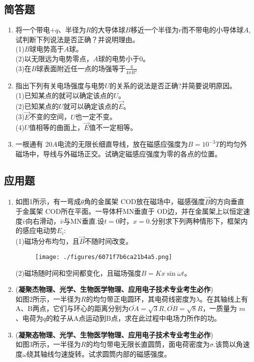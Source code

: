 \subsection{简答题}
\begin{enumerate}
\item 将一个带电$+q$、半径为$R$的大导体球$B$移近一个半径为$r$而不带电的小导体球$A$,试判断下列说法是否正确？并说明理由。\\
(1)$B$球电势高于$A$球。\\
(2)以无限远为电势零点，$A$球的电势小于0。\\
(3)在$B$球表面附近任一点的场强等于$\displaystyle \frac{q}{4\pi R^2}$
\item 指出下列有关电场强度与电势$U$的关系的说法是否正确?并简要说明原因。\\
(1)已知某点的就可以确定该点的$U$。\\
(2)已知某点的$U$就可以确定该点的$\vec E$。\\
(3)$\vec E$不变的空间，$U$也一定不变。\\
(4)$U$值相等的曲面上，$\vec E$值不一定相等。
\item 一根通有 $20A $电流的无限长细直导线，放在磁感应强度为$B=10^{-3}T$的均匀外磁场中，导线与外磁场正交。试确定磁感应强度为零的各点的位置。
\end{enumerate}
\subsection{应用题}
\begin{enumerate}
\item 如图1所示，有一弯成$\theta$角的金属架 COD放在磁场中，磁感强度$\vec B$的方向垂直于金属架 COD所在平面。一导体杆MN垂直于 OD边，并在金属架上以恒定速度$\bar v$向右滑动，$\bar v$与MN垂直.设$t=0$时，$x=0$.分别求下列两种情形下，框架内的感应电动势$E_i$:\\
(1)磁场分布均匀，且$\vec B$不随时间改变。\\
\begin{figure}[ht]
\centering
\texttt{[image: ./figures/6071f7b6ca21b4a5.png]}
\caption{} \label{fig_CD06_1}
\end{figure}
(2)磁场随时间和空间都变化，且磁场强度$B=Kx\sin \omega t$。
\item (\textbf{凝聚杰物理、光学、生物医学物理、应用电子技术专业考生必作})\\
如图2所示，一半径为$R$的均匀带正电圆环，其电荷线密度为$\lambda$。在其轴线上有A、B两点，它们与环心的距离分别为$\displaystyle \bar{OA}=\sqrt{3}R,\bar{OB}=\sqrt{8}R$，一质量为 $m$、电荷为$q$的粒子从A点运动到B点，求在此过程中电场力所作的功。
\item (\textbf{凝聚态物理、光学、生物医学物理、应用电子技术专业考生必作})\\
如图3所示，一半径为$R$的均匀带电无限长直圆筒，面电荷密度为$\sigma$.该筒以角速度$\omega$绕其轴线匀速旋转。试求圆筒内部的磁感强度。
\end{enumerate}